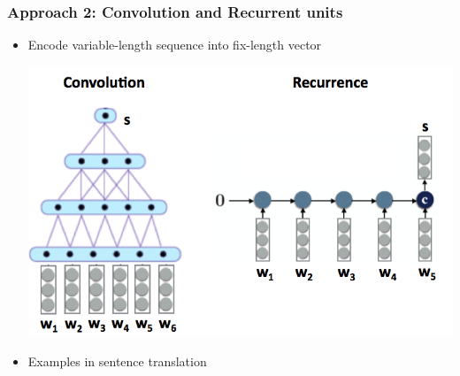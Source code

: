 \documentclass{beamer}
\newcommand{\bi}{\begin{itemize}}
\newcommand{\ei}{\end{itemize}}
\begin{document}
\begin{frame}
\frametitle{Approach 2: Convolution and Recurrent units}
\bi
\item Encode variable-length sequence into fix-length vector
\centerline{\includegraphics[scale=0.3]{figs/sentence_models_conv_recur}}
\item Examples in sentence translation \cite{kalchbrenner13,sutskevar14sequence}
\ei
\end{frame}
\end{document}
